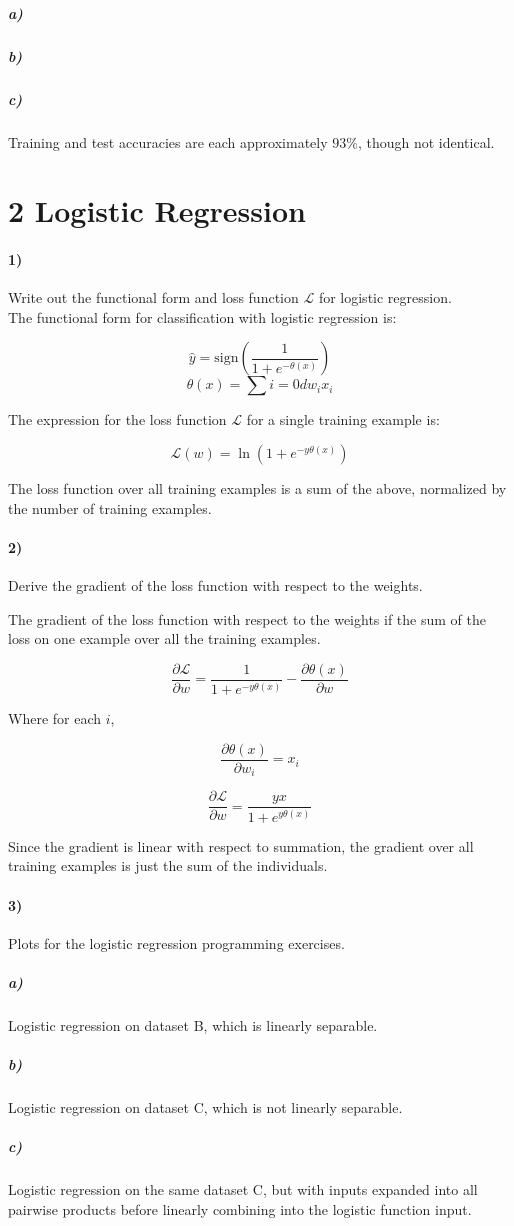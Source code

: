 \documentclass[10pt,letter]{article}
\begin{document}
\subparagraph{a)}

\subparagraph{b)}

\subparagraph{c)} Training and test accuracies are each approximately $93\%$, though not identical.

\section*{2 Logistic Regression}

\paragraph{1)} Write out the functional form and loss function $\mathcal{L}$ for logistic regression.\\

The functional form for classification with logistic regression is:

\[ \hat{y} = \text{sign}(\frac{1}{1 + e^{-\theta(x)}}) \]
\[ \theta(x) = \sum{i=0}{d}{w_ix_i} \]

The expression for the loss function $\mathcal{L}$ for a single training example is:

\[ \mathcal{L}(w) = \ln(1 + e^{-y\theta(x)}) \]

The loss function over all training examples is a sum of the above, normalized by the number of 
training examples.


\paragraph{2)} Derive the gradient of the loss function with respect to the weights.

The gradient of the loss function with respect to the weights if the sum of the loss on one example 
over all the training examples.

\[ \frac{\partial \mathcal{L}}{\partial w} = \frac{1}{1 + e^{-y\theta(x)}} -\frac{\partial \theta(x)}
{\partial w} \]

Where for each $i$,

\[ \frac{\partial\theta(x)}{\partial w_i} = x_i \]

\[ \frac{\partial \mathcal{L}}{\partial w} = \frac{yx}{1 + e^{y\theta(x)}} \]

Since the gradient is linear with respect to summation, the gradient over all training examples is just the sum of the individuals.

\paragraph{3)} Plots for the logistic regression programming exercises.


\subparagraph{a)} Logistic regression on dataset B, which is linearly separable.

\subparagraph{b)} Logistic regression on dataset C, which is not linearly separable.

\subparagraph{c)} Logistic regression on the same dataset C, but with inputs expanded into all 
    pairwise products before linearly combining into the logistic function input.
\end{document}

